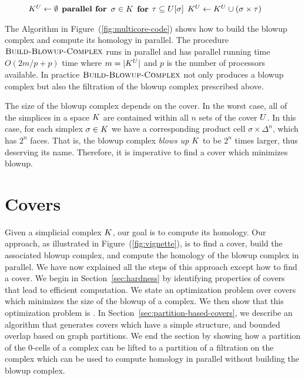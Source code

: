 \begin{figure}
\begin{codebox}
\li $K^{U} \gets \emptyset$
\li $\textbf{parallel for}$ $\sigma \in K$
\li \Do $\textbf{for}$ $\tau \subseteq U[\sigma]$
\li \Do $K^{U} \gets K^{U} \cup (\sigma \times \tau)$ 
\end{codebox}
\end{figure}
The Algorithm in Figure~(\ref{fig:multicore-code}) shows how to build the blowup complex and compute its homology in parallel. 
The procedure $\textnormal{\scshape Build-Blowup-Complex}$ runs in parallel and has parallel running time $O(2m/p + p)$ time where $m = |K^{U}|$ and $p$ is the number of processors available. In practice $\textnormal{\scshape Build-Blowup-Complex}$ not only produces a blowup complex but also the filtration of the blowup complex prescribed above. 

The size of the blowup complex depends on the cover. In the worst case, all of 
the simplices in a space $K$ are contained within all $n$ sets of the cover 
$U$. In this case, for each simplex $\sigma \in K$ we have a corresponding 
product cell $\sigma \times \Delta^n$, which has $2^n$ faces. That is, the 
blowup complex \emph{blows up} $K$ to be $2^n$ times larger, thus deserving 
its name. Therefore, it is imperative to find a cover which minimizes blowup.

\section{Covers}
\label{sec:covers}
Given a simplicial complex $K$, our goal is to compute its homology.  
Our approach, as illustrated in Figure~(\ref{fig:vignette}), is to find a cover, 
build the associated blowup complex, and compute the homology of the blowup complex in 
parallel. We have now explained all the steps of this approach except how to find a cover. 
We begin in Section~\ref{sec:hardness} by identifying 
properties of covers that lead to efficient computation.
We state an optimization problem over covers which 
minimizes the size of the blowup of a complex. We then show that this optimization problem is \NPH{}.  
In Section~\ref{sec:partition-based-covers}, we describe an algorithm 
that generates covers which have a simple structure, and bounded overlap 
based on graph partitions. We end the section by showing how a partition of the 
0-cells of a complex can be lifted to a partition of a filtration on the complex 
which can be used to compute homology in parallel without building the blowup complex.
